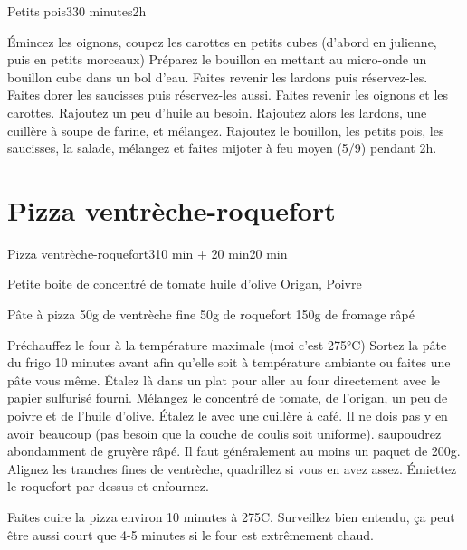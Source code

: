 {\begin{recette}{Petits pois}{3}{30 minutes}{2h}
\begin{preparation}
\etape Émincez les oignons, coupez les carottes en petits cubes (d'abord en julienne, puis en petits morceaux)
\etape Préparez le bouillon en mettant au micro-onde un bouillon cube dans un bol d'eau.
\etape Faites revenir les lardons puis réservez-les. Faites dorer les saucisses puis réservez-les aussi.
\etape Faites revenir les oignons et les carottes. Rajoutez un peu d'huile au besoin.
\etape Rajoutez alors les lardons, une cuillère à soupe de farine, et mélangez.
\etape Rajoutez le bouillon, les petits pois, les saucisses, la salade, mélangez et faites mijoter à feu moyen (5/9) pendant 2h.
\end{preparation}

\end{recette}


\section{Pizza ventrèche-roquefort}
\begin{recette}{Pizza ventrèche-roquefort}{3}{10 min + 20 min}{20 min}
\begin{ingredients}
\ingredient Petite boite de concentré de tomate
\ingredient huile d'olive
\ingredient Origan, Poivre

\ingredient Pâte à pizza
\ingredient 50g de ventrèche fine
\ingredient 50g de roquefort
\ingredient 150g de fromage râpé
\end{ingredients}

\begin{preparation}
\etape Préchauffez le four à la température maximale (moi c'est 275°C)
\etape Sortez la pâte du frigo 10 minutes avant afin qu'elle soit à température ambiante ou faites une pâte vous même.
\etape Étalez là dans un plat pour aller au four directement avec le papier sulfurisé fourni.
\etape Mélangez le concentré de tomate, de l'origan, un peu de poivre et de l'huile d'olive.
\etape Étalez le avec une cuillère à café. Il ne dois pas y en avoir beaucoup (pas besoin que la couche de coulis soit 
uniforme).
\etape saupoudrez abondamment de gruyère râpé. Il faut généralement au moins un paquet de 200g.
\etape Alignez les tranches fines de ventrèche, quadrillez si vous en avez assez. Émiettez le roquefort par dessus et enfournez.
\end{preparation}

\begin{cuisson}
Faites cuire la pizza environ 10 minutes à 275\degres C. Surveillez bien entendu, ça peut être aussi court que 4-5 minutes si 
le four est extrêmement chaud.
\end{cuisson}
\end{recette}

}
